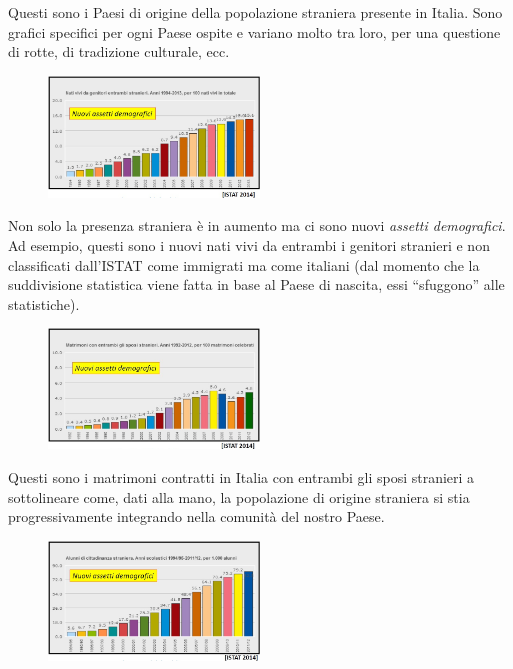 Questi sono i Paesi di origine della popolazione straniera presente in
Italia. Sono grafici specifici per ogni Paese ospite e variano molto tra
loro, per una questione di rotte, di tradizione culturale, ecc.

\begin{figure}[!ht]
\centering
	\includegraphics[width=0.5\textwidth]{26/image12.jpeg}
	\end{figure}

Non solo la presenza straniera è in aumento ma ci sono nuovi
\emph{assetti demografici}. Ad esempio, questi sono i nuovi nati vivi da
entrambi i genitori stranieri e non classificati dall'ISTAT come
immigrati ma come italiani (dal momento che la suddivisione statistica
viene fatta in base al Paese di nascita, essi ``sfuggono'' alle
statistiche).

\begin{figure}[!ht]
\centering
	\includegraphics[width=0.5\textwidth]{26/image13.jpeg}
	\end{figure}

Questi sono i matrimoni contratti in Italia con entrambi gli sposi
stranieri a sottolineare come, dati alla mano, la popolazione di origine
straniera si stia progressivamente integrando nella comunità del nostro
Paese.

\begin{figure}[!ht]
\centering
	\includegraphics[width=0.5\textwidth]{26/image14.jpeg}
	\end{figure}

